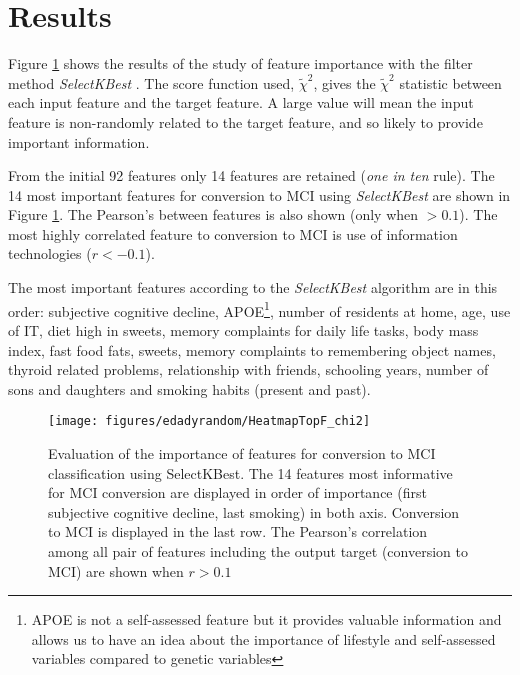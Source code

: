 \documentclass[preprint,12pt]{elsarticle}
\begin{document}




\section{Results}
\label{se:res}

Figure \ref{fig:rf14} shows the results of the study of feature importance with the filter method \emph{SelectKBest} \cite{scikit-learn}. The score function used, $\tilde{\chi}^2$, gives the $\tilde{\chi}^2$ statistic between each input feature and the target feature. A large value will mean the input feature is non-randomly related to the target feature, and so likely to provide important information.

From the initial 92 features only 14 features are retained (\emph{one in ten} rule). The 14 most important features for conversion to MCI using \emph{SelectKBest} are shown in Figure \ref{fig:rf14}. The Pearson's between features is also shown (only when $>0.1$). The most highly correlated feature to conversion to MCI is use of information technologies ($r<-0.1$). 

The most important features according to the \emph{SelectKBest} algorithm are in this order: subjective cognitive decline, APOE\footnote{APOE is not a self-assessed feature but it provides valuable information and allows us to have an idea about the importance of lifestyle and self-assessed variables compared to genetic variables}, number of residents at home, age, use of IT, diet high in sweets, memory complaints for daily life tasks, body mass index, fast food fats, sweets, memory complaints to remembering object names, thyroid related problems, relationship with friends, schooling years, number of sons and daughters and smoking habits (present and past).  

\begin{figure}[!htb]
        \centering
        \texttt{[image: figures/edadyrandom/HeatmapTopF\_chi2]}
        \caption{Evaluation of the importance of features for conversion to MCI classification using SelectKBest. The 14 features most informative for MCI conversion are displayed in order of importance (first subjective cognitive decline, last smoking) in both axis. Conversion to MCI is displayed in the last row. The Pearson's correlation among all pair of features including the output target (conversion to MCI) are shown when $r>0.1$ } 
        \label{fig:rf14}
\end{figure}
\end{document}
